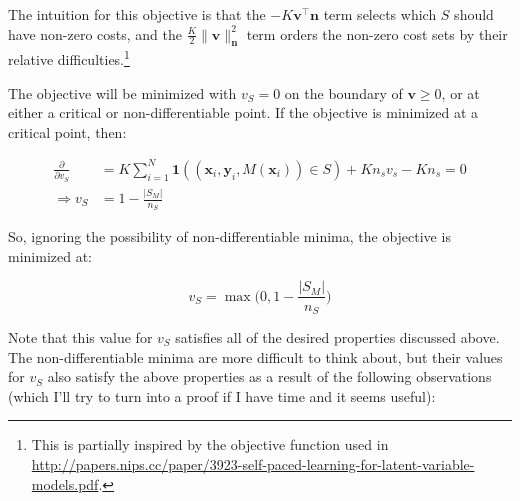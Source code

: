 \documentclass[11pt,letterpaper]{article}
\begin{document}
The intuition for this objective is that the $-K\mathbf{v}^\top\mathbf{n}$ term selects which
$S$ should have non-zero costs, and the $\frac{K}{2}\|\mathbf{v}\|^2_\mathbf{n}$ term orders
the non-zero cost sets by their relative difficulties.\footnote{This is partially inspired
by the objective function used in \url{http://papers.nips.cc/paper/3923-self-paced-learning-for-latent-variable-models.pdf}.} 

The objective will be minimized with $v_S=0$ on the boundary of $\mathbf{v}\geq 0$, 
or at either a critical or non-differentiable point.  If the objective is minimized
at a critical point, then:

\begin{equation}
\begin{split}
\frac{\partial}{\partial v_S} & = K\sum_{i=1}^N\mathbf{1}((\mathbf{x}_i,\mathbf{y}_i, M(\mathbf{x}_i))\in S)+Kn_sv_s-Kn_s=0 \\
\Rightarrow v_S & = 1-\frac{|S_M|}{n_S}
\end{split}
\end{equation}

So, ignoring the possibility of non-differentiable minima, the objective is minimized
at:

\begin{equation}
\label{minimum}
v_S=\max\bigg(0, 1-\frac{|S_M|}{n_S}\bigg)
\end{equation}

Note that this value for $v_S$ satisfies all of the desired properties discussed 
above.  The non-differentiable minima are more difficult to think about, but
their values for $v_S$ also satisfy the above properties as a result of the following observations (which I'll try to turn into a proof if I have time and it seems useful):
\end{document}
